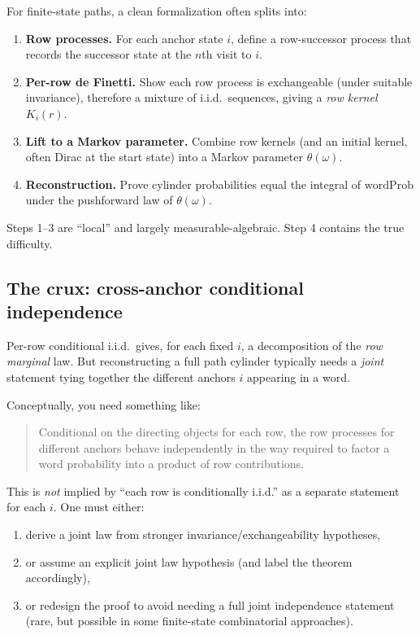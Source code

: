\documentclass[11pt]{article}
\begin{document}
For finite-state paths, a clean formalization often splits into:

\begin{enumerate}[label=\arabic*.]
\item \textbf{Row processes.} For each anchor state $i$, define a row-successor process that records
the successor state at the $n$th visit to $i$.
\item \textbf{Per-row de Finetti.} Show each row process is exchangeable (under suitable invariance),
therefore a mixture of i.i.d.\ sequences, giving a \emph{row kernel} $K_i(r)$.
\item \textbf{Lift to a Markov parameter.} Combine row kernels (and an initial kernel, often Dirac at
the start state) into a Markov parameter $\theta(\omega)$.
\item \textbf{Reconstruction.} Prove cylinder probabilities equal the integral of $\mathrm{wordProb}$
under the pushforward law of $\theta(\omega)$.
\end{enumerate}

Steps 1--3 are ``local'' and largely measurable-algebraic. Step 4 contains the true difficulty.

\subsection{The crux: cross-anchor conditional independence}

Per-row conditional i.i.d.\ gives, for each fixed $i$, a decomposition of the \emph{row marginal} law.
But reconstructing a full path cylinder typically needs a \emph{joint} statement tying together the
different anchors $i$ appearing in a word.

Conceptually, you need something like:

\begin{quote}
Conditional on the directing objects for each row, the row processes for different anchors behave
independently in the way required to factor a word probability into a product of row contributions.
\end{quote}

This is \emph{not} implied by ``each row is conditionally i.i.d.'' as a separate statement for each
$i$. One must either:
\begin{enumerate}[label=(\alph*)]
\item derive a joint law from stronger invariance/exchangeability hypotheses,
\item or assume an explicit joint law hypothesis (and label the theorem accordingly),
\item or redesign the proof to avoid needing a full joint independence statement (rare, but possible in
some finite-state combinatorial approaches).
\end{enumerate}
\end{document}
